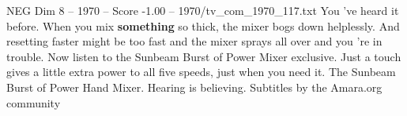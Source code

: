 \begin{textsample}{NEG Dim 8 – 1970 – Score -1.00 – 1970/tv\_com\_1970\_117.txt}  \label{ex:f8_neg_005}
You 've heard it before.
When you mix \textbf{something} so thick, the mixer bogs down helplessly.
And resetting faster might be too fast and the mixer sprays all over and you 're in trouble.
Now listen to the Sunbeam Burst of Power Mixer exclusive.
Just a touch gives a little extra power to all five speeds, just when you need it.
The Sunbeam Burst of Power Hand Mixer.
Hearing is believing.
Subtitles by the Amara.org community

\end{textsample}
